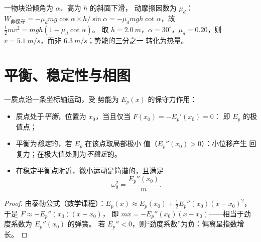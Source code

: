 \begin{example}[摩擦损失的能量]\label{ex:b1:work-and-energy:friction}
一物块沿倾角为 $\alpha$、高为 $h$ 的斜面下滑，
动摩擦因数为 $\mu_d$：$W_{\text{非保守}} = -\mu_dmg\cos\alpha \times
h/\sin\alpha = -\mu_dmgh\cot\alpha$，故 $\tfrac12 mv^2 = mgh(1 - \mu_d\cot\alpha)$。
取 $h = \qty{2.0}{m}$，$\alpha = 30^\circ$，$\mu_d = 0.20$，则 $v =
\qty{5.1}{m/s}$，而非 $\qty{6.3}{m/s}$；势能的三分之一
转化为热量。
\end{example}

\section{平衡、稳定性与相图}

\begin{proposition}[一维情形下的平衡与稳定性]\label{prop:b1:work-and-energy:stability}
一质点沿一条坐标轴运动，受
势能为 $E_p(x)$ 的保守力作用：
\begin{itemize}
  \item 质点处于\emph{平衡}，位置为 $x_0$，当且仅当 $F(x_0) = -E_p'(x_0) = 0$：
        即 $E_p$ 的极值点；
  \item 平衡为\emph{稳定}的，若 $E_p$ 在该点取局部极小
        值（$E_p''(x_0) > 0$）：小位移产生
        回复力；在极大值处则为\emph{不稳定}的。
  \item 在稳定平衡点附近，微小运动是简谐的，且满足
        \[
        \omega_0^2 = \frac{E_p''(x_0)}{m} .
        \]
\end{itemize}
\end{proposition}

\begin{proof}
由泰勒公式（数学课程）：$E_p(x) \approx E_p(x_0) +
\tfrac12 E_p''(x_0)(x - x_0)^2$，于是 $F \approx -E_p''(x_0)(x - x_0)$，
即 $m\ddot x = -E_p''(x_0)(x - x_0)$——相当于劲度系数为 $E_p''(x_0)$ 的弹簧。
若 $E_p'' < 0$，则“劲度系数”为负：偏离呈指数增长。
\end{proof}

